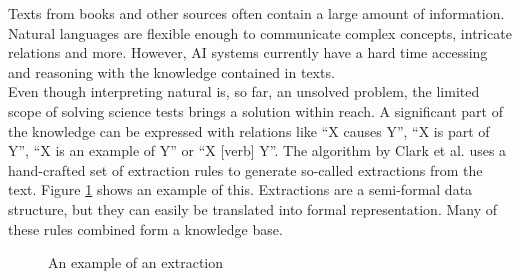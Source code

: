 Texts from books and other sources often contain a large amount of information. Natural languages are flexible enough to communicate complex concepts, intricate relations and more. However, AI systems currently have a hard time accessing and reasoning with the knowledge contained in texts.
\\
Even though interpreting natural is, so far, an unsolved problem, the limited scope of solving science tests brings a solution within reach. A significant part of the knowledge can be expressed with relations like ``X causes Y'', ``X is part of Y'', ``X is an example of Y'' or ``X [verb] Y''. The algorithm by Clark et al. \cite{construction} uses a hand-crafted set of extraction rules to generate so-called extractions from the text. Figure \ref{fig:extraction} shows an example of this. Extractions are a semi-formal data structure, but they can easily be translated into formal representation. Many of these rules combined form a knowledge base.

\begin{figure}
\noindent{}
\caption{An example of an extraction}
\label{fig:extraction}
\end{figure}